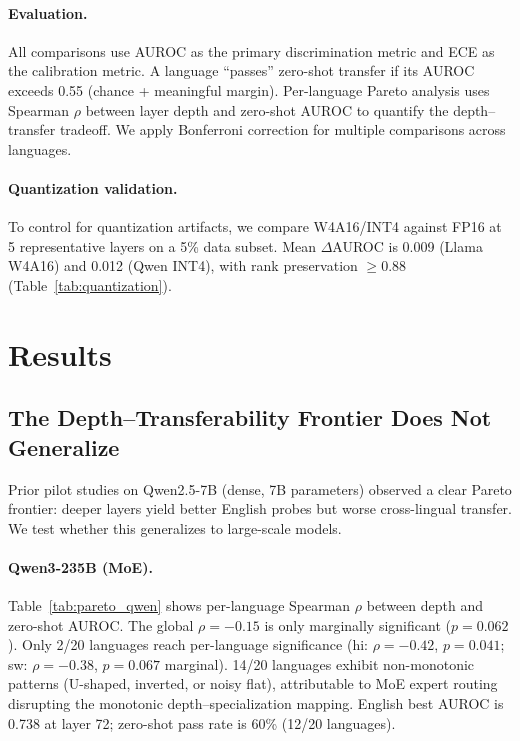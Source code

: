 \documentclass[11pt,a4paper]{article}
\newcommand{\auroc}{AUROC}
\newcommand{\ece}{ECE}
\begin{document}
\paragraph{Evaluation.}
All comparisons use \auroc{} as the primary discrimination metric and \ece{} as the calibration metric.
A language ``passes'' zero-shot transfer if its \auroc{} exceeds 0.55 (chance + meaningful margin).
Per-language Pareto analysis uses Spearman $\rho$ between layer depth and zero-shot \auroc{} to quantify the depth--transfer tradeoff.
We apply Bonferroni correction for multiple comparisons across languages.

\paragraph{Quantization validation.}
To control for quantization artifacts, we compare W4A16/INT4 against FP16 at 5 representative layers on a 5\% data subset.
Mean $\Delta$\auroc{} is 0.009 (Llama W4A16) and 0.012 (Qwen INT4), with rank preservation $\geq 0.88$ (Table~\ref{tab:quantization}).

\section{Results}
\label{sec:results}

\subsection{The Depth--Transferability Frontier Does Not Generalize}
\label{sec:pareto}

Prior pilot studies on Qwen2.5-7B (dense, 7B parameters) observed a clear Pareto frontier: deeper layers yield better English probes but worse cross-lingual transfer.
We test whether this generalizes to large-scale models.

\paragraph{Qwen3-235B (MoE).}
Table~\ref{tab:pareto_qwen} shows per-language Spearman $\rho$ between depth and zero-shot \auroc{}.
The global $\rho = -0.15$ is only marginally significant ($p = 0.062$).
Only 2/20 languages reach per-language significance (hi: $\rho = -0.42$, $p = 0.041$; sw: $\rho = -0.38$, $p = 0.067$ marginal).
14/20 languages exhibit non-monotonic patterns (U-shaped, inverted, or noisy flat), attributable to MoE expert routing disrupting the monotonic depth--specialization mapping.
English best \auroc{} is 0.738 at layer 72; zero-shot pass rate is 60\% (12/20 languages).
\end{document}

